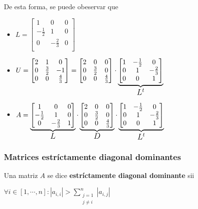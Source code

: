 \documentclass[]{article}
\begin{document}
De esta forma, se puede obeservar que
\begin{itemize}
	\item

	$L = \begin{bmatrix}
		1&0&0\\
		-\frac{1}{2}&1&0\\
		0&-\frac{2}{3}&0\\
	\end{bmatrix}$

\item
	$U = \begin{bmatrix}
		2&1&0\\
		0&\frac{3}{2}&-1\\
		0&0&\frac{4}{3}
	\end{bmatrix} = \begin{bmatrix}
		2&0&0\\
		0&\frac{3}{2}&0\\
		0&0&\frac{4}{3}
	\end{bmatrix} \cdot \underbrace{\begin{bmatrix}
		1&-\frac{1}{2}&0\\
		0&1&-\frac{2}{3}\\
		0&0&1
	\end{bmatrix}}_{\text{\mbox{\large{$L^t$}}}}$

	\item $A = \underbrace{\begin{bmatrix}
		1&0&0\\
		-\frac{1}{2}&1&0\\
		0&-\frac{2}{3}&1
	\end{bmatrix}}_{\text{\mbox{\large{$L$}}}} \cdot \underbrace{\begin{bmatrix}
		2&0&0\\
		0&\frac{3}{2}&0\\
		0&0&\frac{4}{3}
	\end{bmatrix}}_{\text{\mbox{\large{$D$}}}} \cdot \underbrace{\begin{bmatrix}
		1&-\frac{1}{2}&0\\
		0&1&-\frac{2}{3}\\
		0&0&1
	\end{bmatrix}}_{\text{\mbox{\large{$L^t$}}}}$
\end{itemize}

\subsubsection{Matrices estríctamente diagonal dominantes}
\begin{defi}
	Una matriz $A$ se dice \textbf{estríctamente diagonal dominante} sii
	\begin{center}
		$\forall i \in [1,\cdots,n] : |a_{i,i}| > \displaystyle \sum_{\substack{j=1 \\ j \neq i}}^{n}{|a_{i,j}|}$
	\end{center}
\end{defi}
\end{document}
